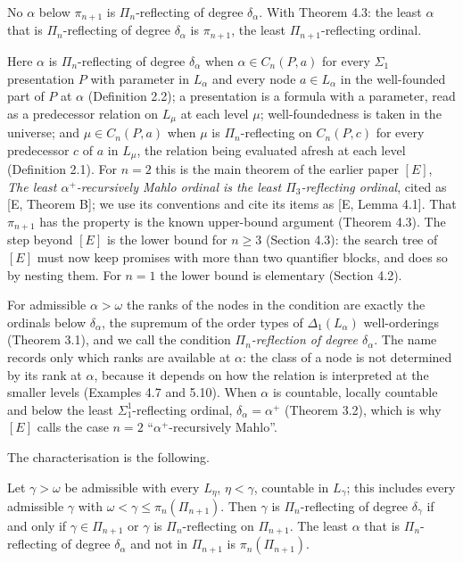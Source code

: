 \documentclass[11pt]{article}
\begin{document}
\begin{statement} No $\alpha$ below $\pi_{n+1}$ is $\Pi_n$-reflecting of
degree $\delta_\alpha$. With Theorem 4.3: the least $\alpha$ that is $\Pi_n$-reflecting of degree $\delta_\alpha$ is
$\pi_{n+1}$, the least $\Pi_{n+1}$-reflecting ordinal.
\end{statement}

Here $\alpha$ is $\Pi_n$-reflecting of degree $\delta_\alpha$ when $\alpha \in C_n(P,a)$ for every $\Sigma_1$
presentation $P$ with parameter in $L_\alpha$ and every node $a \in L_\alpha$ in the well-founded part of $P$ at $\alpha$
(Definition 2.2); a presentation is a formula with a parameter, read as a predecessor relation on $L_\mu$ at each level $\mu$; well-foundedness is taken in
the universe; and $\mu \in C_n(P,a)$ when $\mu$ is $\Pi_n$-reflecting on $C_n(P,c)$ for every predecessor $c$ of $a$
in $L_\mu$, the relation being evaluated afresh at each level (Definition 2.1). For $n = 2$ this is the main theorem of
the earlier paper $[E]$, \emph{The least $\alpha^+$-recursively Mahlo ordinal is the least $\Pi_3$-reflecting
ordinal}, cited as [E, Theorem B]; we use its conventions and cite its items as [E, Lemma 4.1].
That $\pi_{n+1}$ has the property is the known upper-bound argument (Theorem 4.3). The step beyond $[E]$ is the lower bound
for $n \ge 3$ (Section 4.3): the search tree of $[E]$ must now keep promises with more than two quantifier blocks, and does so by
nesting them. For $n = 1$ the lower bound is elementary (Section 4.2).

For admissible $\alpha > \omega$ the ranks of the nodes in the condition are exactly the ordinals below
$\delta_\alpha$, the supremum of the order types of $\Delta_1(L_\alpha)$ well-orderings (Theorem 3.1), and we call the
condition \emph{$\Pi_n$-reflection of degree $\delta_\alpha$}. The name records only which ranks are available at
$\alpha$: the class of a node is not determined by its rank at $\alpha$, because it depends on how the relation is
interpreted at the smaller levels (Examples 4.7 and 5.10). When $\alpha$ is countable, locally countable and below the
least $\Sigma^1_1$-reflecting ordinal, $\delta_\alpha = \alpha^+$ (Theorem 3.2), which is why $[E]$ calls the case $n =
2$ ``$\alpha^+$-recursively Mahlo''.

The characterisation is the following.

\begin{statement} Let $\gamma > \omega$ be admissible with every
$L_\eta$, $\eta < \gamma$, countable in $L_\gamma$; this includes every admissible $\gamma$ with $\omega < \gamma \le
\pi_n(\Pi_{n+1})$. Then $\gamma$ is $\Pi_n$-reflecting of degree $\delta_\gamma$ if and only if $\gamma \in \Pi_{n+1}$ or
$\gamma$ is $\Pi_n$-reflecting on $\Pi_{n+1}$. The least $\alpha$ that is $\Pi_n$-reflecting of degree $\delta_\alpha$ and
not in $\Pi_{n+1}$ is $\pi_n(\Pi_{n+1})$.
\end{statement}
\end{document}
